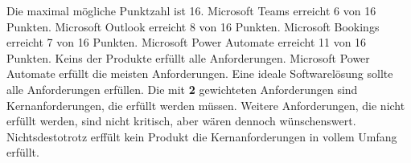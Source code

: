 \normalsize
\newline
\newline
Die maximal mögliche Punktzahl ist 16.
Microsoft Teams erreicht 6 von 16 Punkten.
Microsoft Outlook erreicht 8 von 16 Punkten.
Microsoft Bookings erreicht 7 von 16 Punkten.
Microsoft Power Automate erreicht 11 von 16 Punkten.
\newline
Keins der Produkte erfüllt alle Anforderungen.
Microsoft Power Automate erfüllt die meisten Anforderungen.
Eine ideale Softwarelösung sollte alle Anforderungen erfüllen.
Die mit \textbf{2} gewichteten Anforderungen sind Kernanforderungen, die erfüllt werden müssen.
Weitere Anforderungen, die nicht erfüllt werden, sind nicht kritisch, aber wären dennoch wünschenswert.
Nichtsdestotrotz erffült kein Produkt die Kernanforderungen in vollem Umfang erfüllt.
\newline
\newline
